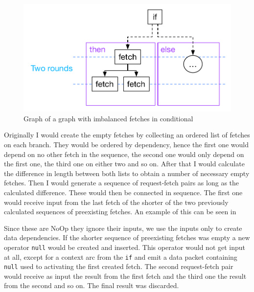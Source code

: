 \begin{figure}
    \includegraphics[width=\linewidth]{../Figures/if-insert-empty-parallel-before}
    \caption{Graph of a graph with imbalanced fetches in conditional}
    \label{fig:if-insert-empty-parallel-before}
\end{figure}

Originally I would create the empty fetches by collecting an ordered list of fetches on each branch.
They would be ordered by dependency, hence the first one would depend on no other fetch in the sequence, the second one would only depend on the first one, the third one on either two and so on.
After that I would calculate the difference in length between both lists to obtain a number of necessary empty fetches.
Then I would generate a sequence of request-fetch pairs as long as the calculated difference.
These would then be connected in sequence.
The first one would receive input from the last fetch of the shorter of the two previously calculated sequences of preexisting fetches.
An example of this can be seen in

Since these are NoOp they ignore their inputs, we use the inputs only to create data dependencies.
If the shorter sequence of preexisting fetches was empty a new operator \texttt{null} would be created and inserted.
This operator would not get input at all, except for a context arc from the \texttt{if} and emit a data packet containing \texttt{null} used to activating the first created fetch.
The second request-fetch pair would receive as input the result from the first fetch and the third one the result from the second and so on.
The final result was discarded.

